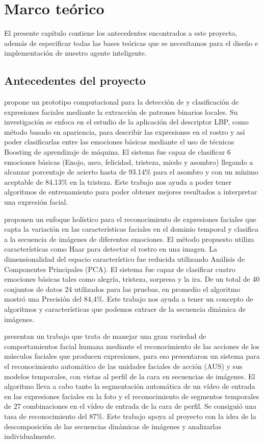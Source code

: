 \chapter{Marco teórico}

El presente capítulo contiene los antecedentes encontrados a este proyecto, además de especificar todas las bases teóricas que se necesitamos para el diseño e implementación de nuestro agente inteligente.

\section{Antecedentes del proyecto}

\cite{Cama} propone un prototipo computacional para la detección de y clasificación de expresiones faciales mediante la extracción de patrones binarios locales. Su investigación se enfoca en el estudio de la aplicación del descriptor LBP, como método basado en apariencia, para describir las expresiones en el rostro y así poder clasificarlas entre las emociones básicas mediante el uso de técnicas Boosting de aprendizaje de máquina. El sistema fue capaz de clasificar 6 emociones básicas (Enojo, asco, felicidad, tristeza, miedo y asombro) llegando a alcanzar porcentaje de acierto hasta de 93.14\% para el asombro y con un mínimo aceptable de 84.13\% en la tristeza. Este trabajo nos ayuda a poder tener algoritmos de entrenamiento para poder obtener mejores resultados a interpretar una expresión facial.
\vskip 0.1cm

\cite{Bajaj} proponen un enfoque holístico para el reconocimiento de expresiones faciales que capta la variación en las características faciales en el dominio temporal y clasifica a la secuencia de imágenes de diferentes emociones. El método propuesto utiliza características como Haar para detectar el rostro en una imagen. La dimensionalidad del espacio característico fue reducida utilizando Análisis de Componentes Principales (PCA). El sistema fue capaz de clasificar cuatro emociones básicas tales como alegría, tristeza, sorpresa y la ira. De un total de 40 conjuntos de datos 24 utilizados para las pruebas, en promedio el algoritmo mostró una Precisión del 84,4\%. Este trabajo nos ayuda a tener un concepto de algoritmos y características que podemos extraer de la secuencia dinámica de imágenes. 
\vskip 0.1cm

\cite{Pantic} presentan un trabajo que trata de manejar una gran variedad de comportamientos facial humana mediante el reconocimiento de las acciones de los músculos faciales que producen expresiones, para eso presentaron un sistema para el reconocimiento automático de las unidades faciales de acción (AUS) y sus modelos temporales, con vistas al perfil de la cara en secuencias de imágenes. El algoritmo lleva a cabo tanto la segmentación automática de un vídeo de entrada en las expresiones faciales en la foto y el reconocimiento de segmentos temporales de 27 combinaciones en el vídeo de entrada de la cara de perfil. Se consiguió una tasa de reconocimiento del 87\%. Este trabajo apoya al proyecto con la idea de la descomposición de las secuencias dinámicas de imágenes y analizarlas individualmente. 


